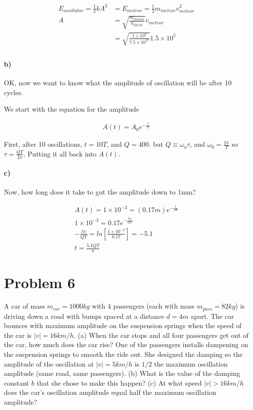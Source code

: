 \documentclass[10pt]{article}
\newcommand{\boxeq}[1]{%
  \begin{center}%
    \boxed{#1}%
  \end{center}%
}
\begin{document}
\begin{align*}
  E_{oscillator}=\frac{1}{2}kA^2&=E_{meteor}=\frac{1}{2}m_{meteor}v_{meteor}^2\\
  A&=\sqrt{\frac{m_{meteor}}{k_{Earth}}}v_{meteor}\\
   &=\sqrt{\frac{1\times 10^8}{7.5\times 10^{17}}}1.5\times 10^5\\
\end{align*}

\boxeq{A=0.17m=17cm}

\paragraph{b)}
\label{par:b_}

OK, now we want to know what the amplitude of oscillation will be after 10
cycles.

We start with the equation for the amplitude

\begin{align*}
  A(t) = A_0e^{-\frac{t}{2\tau}}
\end{align*}

First, after 10 oscillations, $t=10T$, and $Q=400$. but $Q\equiv \omega_o
\tau$, and $\omega_0=\frac{2\pi}{T}$ so $\tau = \frac{QT}{2\pi}$. Putting it all
back into $A(t)$.

\boxeq{A_{10}=15.7cm}

\paragraph{c)}
\label{par:c_}

Now, how long does it take to gut the amplitude down to 1mm?

\begin{align*}
  A(t) = 1\times 10^{-3}=(0.17m)e^{-\frac{t}{2\pi}}\\
  1\times 10^{-3}=0.17e^{-\frac{t\pi}{QT}}\\
  -\frac{t\pi}{QT}=ln\left[\frac{1\times10^{-3}}{0.17}\right]=-5.1\\
  t=\frac{5.1QT}{\pi}
\end{align*}
\boxeq{t=3.5\times 10^4min}

\section*{Problem 6}
\label{sec:problem_6}

A car of mass $m_{car}=1000kg$ with 4 passengers (each with mass
$m_{pass}=82kg$) is driving down a road with bumps spaced at a distance $d=4m$
apart. The car bounces with maximum amplitude on the suspension springs when
the speed of the car is $|v|=16km/h$. (a) When the car stops and all four
passengers get out of the car, how much does the car rise? One of the
passengers installs dampening on the suspension springs to smooth the ride out.
She designed the damping so the amplitude of the oscillation at $|v|=5km/h$ is
$1/2$ the maximum oscillation amplitude (same road, same passengers). (b) What
is the value of the damping constant $b$ that she chose to make this happen?
(c) At what speed $|v|>16km/h$ does the car's oscillation amplitude equal half
the maximum oscillation amplitude?
\end{document}
